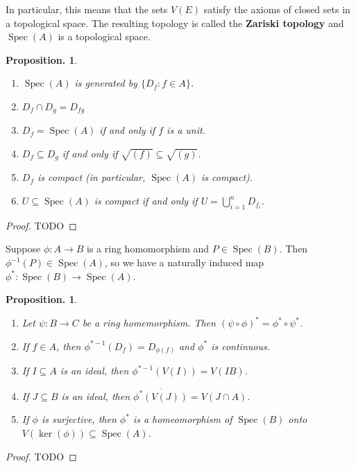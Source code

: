 \documentclass[11pt, a4paper]{memoir}
\newcommand{\ol}[1]{\ensuremath{\overline{#1}}}
\theoremstyle{change}
\newtheorem{proposition}[theorem]{Proposition.}
\theoremstyle{plain}
\theoremstyle{nonumberplain}
\newtheorem{proof}{Proof}
\DeclareMathOperator{\Spec}{Spec}
\numberwithin{equation}{section}
\begin{document}
In particular, this means that the sets $V(E)$ satisfy the axioms of closed sets in a topological space.
The resulting topology is called the \textbf{Zariski topology} and $\Spec(A)$ is a topological space.
\begin{proposition}
    \begin{enumerate}[nl,r]
        \item $\Spec(A)$ is generated by $\{D_f:f\in A\}$.
        \item $D_f\cap D_g=D_{fg}$
        \item $D_f=\Spec(A)$ if and only if $f$ is a unit.
        \item $D_f\subseteq D_g$ if and only if $\sqrt{(f)}\subseteq\sqrt{(g)}$.
        \item $D_f$ is compact (in particular, $\Spec(A)$ is compact).
        \item $U\subseteq\Spec(A)$ is compact if and only if $U=\bigcup_{i=1}^n D_{f_i}$.
    \end{enumerate}
\end{proposition}
\begin{proof}
    TODO
\end{proof}
Suppose $\phi:A\to B$ is a ring homomorphism and $P\in\Spec(B)$.
Then $\phi^{-1}(P)\in\Spec(A)$, so we have a naturally induced map $\phi^*:\Spec(B)\to\Spec(A)$.
\begin{proposition}
    \begin{enumerate}[nl,r]
        \item Let $\psi:B\to C$ be a ring homemorphism.
            Then $(\psi\circ\phi)^*=\phi^*\circ\psi^*$.
        \item If $f\in A$, then $\phi^{*-1}(D_f)=D_{\phi(f)}$ and $\phi^*$ is continuous.
        \item If $I\subseteq A$ is an ideal, then $\phi^{*-1}(V(I))=V(IB)$.
        \item If $J\subseteq B$ is an ideal, then $\ol{\phi^*(V(J))}=V(J\cap A)$.
        \item If $\phi$ is surjective, then $\phi^*$ is a homeomorphism of $\Spec(B)$ onto $V(\ker(\phi))\subseteq\Spec(A)$.
    \end{enumerate}
\end{proposition}
\begin{proof}
    TODO
\end{proof}
\end{document}
